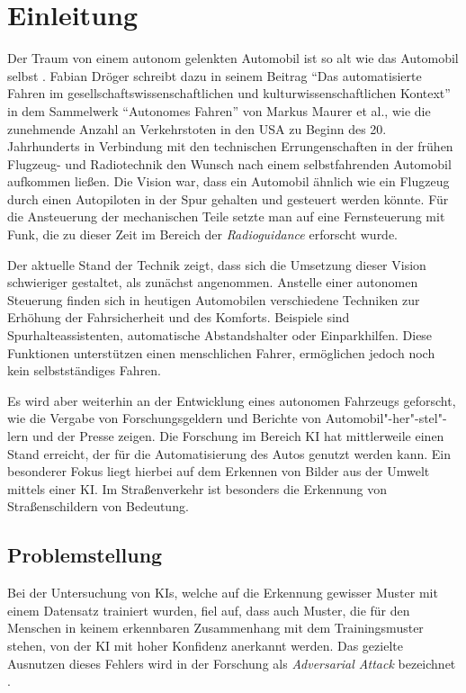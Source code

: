 \chapter{Einleitung}
\label{cha:Einleitung}
\setlength{\epigraphwidth}{4in}

Der Traum von einem autonom gelenkten Automobil ist so alt wie das Automobil selbst \cite{maurer_autonomes_2015}. Fabian Dröger schreibt dazu in seinem Beitrag "`Das automatisierte Fahren im gesellschaftswissenschaftlichen und kulturwissenschaftlichen Kontext"' in dem Sammelwerk "`Autonomes Fahren"' von Markus Maurer et al., wie die zunehmende Anzahl an Verkehrstoten in den USA zu Beginn des 20. Jahrhunderts in Verbindung mit den technischen Errungenschaften in der frühen Flugzeug- und Radiotechnik den Wunsch nach einem selbstfahrenden Automobil aufkommen ließen. Die Vision war, dass ein Automobil ähnlich wie ein Flugzeug durch einen Autopiloten in der Spur gehalten und gesteuert werden könnte. Für die Ansteuerung der mechanischen Teile setzte man auf eine Fernsteuerung mit Funk, die zu dieser Zeit im Bereich der \emph{Radioguidance} erforscht wurde.

Der aktuelle Stand der Technik zeigt, dass sich die Umsetzung dieser Vision schwieriger gestaltet, als zunächst angenommen. Anstelle einer autonomen Steuerung finden sich in heutigen Automobilen verschiedene Techniken zur Erhöhung der Fahrsicherheit und des Komforts. Beispiele sind Spurhalteassistenten, automatische Abstandshalter oder Einparkhilfen. Diese Funktionen unterstützen einen menschlichen Fahrer, ermöglichen jedoch noch kein selbstständiges Fahren.

Es wird aber weiterhin an der Entwicklung eines autonomen Fahrzeugs geforscht, wie die Vergabe von Forschungsgeldern\cite{bmbf-internetredaktion_auto_nodate} und Berichte von Automobil"-her"-stel"-lern\cite{bmw_autonomes_nodate} und der Presse\cite{efler_autonomes_2018} zeigen. Die Forschung im Bereich \ac{KI} hat mittlerweile einen Stand erreicht, der für die Automatisierung des Autos genutzt werden kann. Ein besonderer Fokus liegt hierbei auf dem Erkennen von Bilder aus der Umwelt mittels einer \ac{KI}. Im Straßenverkehr ist besonders die Erkennung von Straßenschildern von Bedeutung.


\section{Problemstellung}
Bei der Untersuchung von \acp{KI}, welche auf die Erkennung gewisser Muster mit einem Datensatz trainiert wurden, fiel auf, dass auch Muster, die für den Menschen in keinem erkennbaren Zusammenhang mit dem Trainingsmuster stehen, von der \ac{KI} mit hoher Konfidenz anerkannt werden. Das gezielte Ausnutzen dieses Fehlers wird in der Forschung als \textit{Adversarial Attack} bezeichnet \cite{DBLP:journals/corr/HuangPGDA17}.

